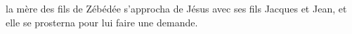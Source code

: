 \encetemps
	la mère des fils de Zébédée s’approcha de Jésus avec ses fils Jacques et Jean,
	et elle se prosterna pour lui faire une demande.
